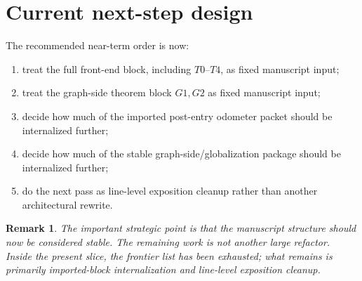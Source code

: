 \documentclass[11pt]{article}
\newtheorem{remark}[theorem]{Remark}
\begin{document}
\section{Current next-step design}

The recommended near-term order is now:
\begin{enumerate}[label=\textup{(\arabic*)},leftmargin=2.8em]
\item treat the full front-end block, including \(T0\)--\(T4\), as fixed manuscript input;
\item treat the graph-side theorem block \(G1,G2\) as fixed manuscript input;
\item decide how much of the imported post-entry odometer packet should be internalized further;
\item decide how much of the stable graph-side/globalization package should be internalized further;
\item do the next pass as line-level exposition cleanup rather than another architectural rewrite.
\end{enumerate}

\begin{remark}
The important strategic point is that the manuscript structure should now be
considered stable.
The remaining work is not another large refactor.
Inside the present slice, the frontier list has been exhausted; what remains is
primarily imported-block internalization and line-level exposition cleanup.
\end{remark}
\end{document}

